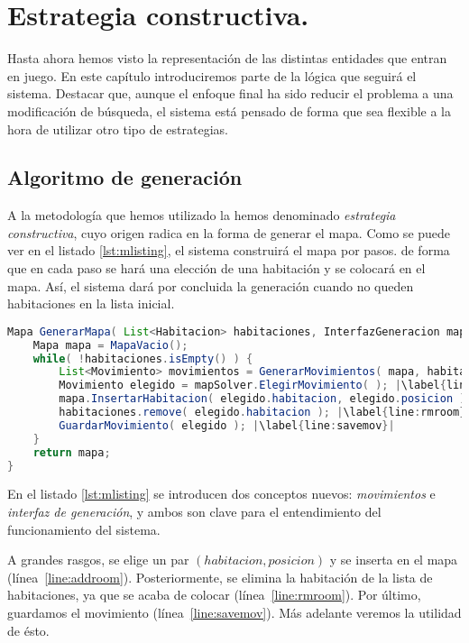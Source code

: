 \chapter{Estrategia constructiva.}\label{cap:capitulo4}

Hasta ahora hemos visto la representación de las distintas entidades que entran en juego. En este capítulo introduciremos parte de la lógica que seguirá el sistema. Destacar que, aunque el enfoque final ha sido reducir el problema a una modificación de búsqueda, el sistema está pensado de forma que sea flexible a la hora de utilizar otro tipo de estrategias.


\section{Algoritmo de generación}
A la metodología que hemos utilizado la hemos denominado \emph{estrategia constructiva}, cuyo origen radica en la forma de generar el mapa. Como se puede ver en el listado \ref{lst:mlisting}, el sistema construirá el mapa por pasos. de forma que en cada paso se hará una elección de una habitación y se colocará en el mapa. Así, el sistema dará por concluida la generación cuando no queden habitaciones en la lista inicial.

\begin{lstlisting}[caption={Algoritmo constructivo para generar mapas},label={lst:mlisting},language=Java,escapechar=|]
Mapa GenerarMapa( List<Habitacion> habitaciones, InterfazGeneracion mapSolver ) {
	Mapa mapa = MapaVacio();
	while( !habitaciones.isEmpty() ) {
		List<Movimiento> movimientos = GenerarMovimientos( mapa, habitaciones ); |\label{line:movgen}|
		Movimiento elegido = mapSolver.ElegirMovimiento( ); |\label{line:ifaceselect}|
		mapa.InsertarHabitacion( elegido.habitacion, elegido.posicion ); |\label{line:addroom}|
		habitaciones.remove( elegido.habitacion ); |\label{line:rmroom}|
		GuardarMovimiento( elegido ); |\label{line:savemov}|
	}
	return mapa;
}
\end{lstlisting}

En el listado \ref{lst:mlisting} se introducen dos conceptos nuevos: \emph{movimientos} e \emph{interfaz de generación}, y ambos son clave para el entendimiento del funcionamiento del sistema.

A grandes rasgos, se elige un par $(habitacion, posicion)$ y se inserta en el mapa (línea~\ref{line:addroom}). Posteriormente, se elimina la habitación de la lista de habitaciones, ya que se acaba de colocar (línea~\ref{line:rmroom}). Por último, guardamos el movimiento (línea~\ref{line:savemov}). Más adelante veremos la utilidad de ésto.

